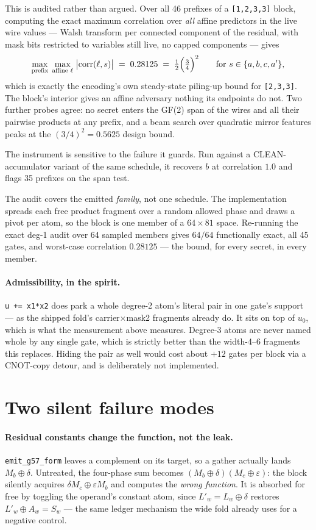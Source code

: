 \documentclass[11pt]{article}
\newcommand{\xor}{\oplus}
\newcommand{\code}[1]{\texttt{#1}}
\begin{document}
This is audited rather than argued. Over all 46 prefixes of a \code{[1,2,3,3]}
block, computing the exact maximum correlation over \emph{all} affine
predictors in the live wire values --- Walsh transform per connected component
of the residual, with mask bits restricted to variables still live, no capped
components --- gives
\[
  \max_{\text{prefix}} \; \max_{\text{affine } \ell} \;
  \bigl|\mathrm{corr}(\ell, s)\bigr| \;=\; 0.28125 \;=\; \tfrac12\Bigl(\tfrac34\Bigr)^{2}
  \qquad \text{for } s \in \{a,b,c,a'\},
\]
which is exactly the encoding's own steady-state piling-up bound for
\code{[2,3,3]}. The block's interior gives an affine adversary nothing its
endpoints do not. Two further probes agree: no secret enters the GF(2) span of
the wires and all their pairwise products at any prefix, and a beam search over
quadratic mirror features peaks at the $(3/4)^2 = 0.5625$ design bound.

The instrument is sensitive to the failure it guards. Run against a
CLEAN-accumulator variant of the same schedule, it recovers $b$ at correlation
$1.0$ and flags 35 prefixes on the span test.

The audit covers the emitted \emph{family}, not one schedule. The
implementation spreads each free product fragment over a random allowed phase
and draws a pivot per atom, so the block is one member of a
$64 \times 81$ space. Re-running the exact deg-1 audit over 64 sampled members
gives $64/64$ functionally exact, all 45 gates, and worst-case correlation
$0.28125$ --- the bound, for every secret, in every member.

\paragraph{Admissibility, in the spirit.} \code{u += x1*x2} does park a whole
degree-2 atom's literal pair in one gate's support --- as the shipped fold's
carrier${\times}$mask2 fragments already do. It sits on top of $u_0$, which is
what the measurement above measures. Degree-3 atoms are never named whole by
any single gate, which is strictly better than the width-4--6 fragments this
replaces. Hiding the pair as well would cost about $+12$ gates per block via a
CNOT-copy detour, and is deliberately not implemented.

\section{Two silent failure modes}

\paragraph{Residual constants change the function, not the leak.}
\code{emit\_g57\_form} leaves a complement on its target, so a gather actually
lands $M_b \xor \delta$. Untreated, the four-phase sum becomes
$(M_b \xor \delta)(M_c \xor \varepsilon)$: the block silently acquires
$\delta M_c \xor \varepsilon M_b$ and computes the \emph{wrong function}. It is
absorbed for free by toggling the operand's constant atom, since
$L'_w = L_w \xor \delta$ restores $L'_w \xor A_w = S_w$ --- the same ledger
mechanism the wide fold already uses for a negative control.
\end{document}
